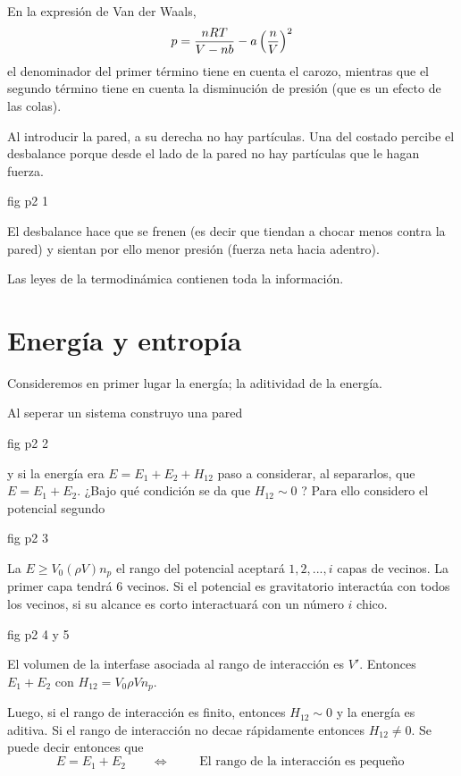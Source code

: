 \documentclass[10pt,oneside]{CBFT_book}
\begin{document}
En la expresión de Van der Waals,
\[
	p = \frac{nRT}{V - nb} - a \left( \frac{ n }{ V } \right)^2
\]
el denominador del primer término tiene en cuenta el carozo, mientras que el segundo término tiene en
cuenta la disminución de presión (que es un efecto de las colas).

Al introducir la pared, a su derecha no hay partículas. Una del costado percibe el desbalance porque
desde el lado de la pared no hay partículas que le hagan fuerza.

fig p2 1

El desbalance hace que se frenen (es decir que tiendan a chocar menos contra la pared) y sientan por
ello menor presión (fuerza neta hacia adentro).

Las leyes de la termodinámica contienen toda la información.

\section{Energía y entropía}

Consideremos en primer lugar la energía; la aditividad de la energía.

Al seperar un sistema construyo una pared

fig p2 2

y si la energía era $E = E_1 + E_2 + H_{12}$ paso a considerar, al separarlos, que $E= E_1 + E_2$.
¿Bajo qué condición se da que $H_{12} \sim 0$ ? Para ello considero el potencial segundo

fig p2 3

La $E \geq V_0(\rho V)n_p$ el rango del potencial aceptará $1,2,...,i$ capas de vecinos. La primer capa
tendrá 6 vecinos. Si el potencial es gravitatorio interactúa con todos los vecinos, si su alcance es corto
interactuará con un número $i$ chico.

fig p2 4 y 5

El volumen de la interfase asociada al rango de interacción es $V'$. Entonces $ E_1 + E_2 $ con 
$H_{12} = V_0 \rho V n_p $.

Luego, si el rango de interacción es finito, entonces $H_{12} \sim 0$ y la energía es aditiva.
Si el rango de interacción no decae rápidamente entonces $H_{12} \neq 0$.
Se puede decir entonces que
\[
	E = E_1 + E_2 \qquad \Longleftrightarrow \qquad  \text{ El rango de la interacción es pequeño }
\]
\end{document}
